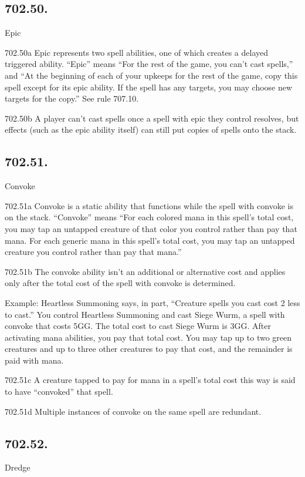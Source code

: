 \subsection*{702.50.}
Epic

702.50a Epic represents two spell abilities, one of which creates a delayed triggered ability. “Epic” means “For the rest of the game, you can’t cast spells,” and “At the beginning of each of your upkeeps for the rest of the game, copy this spell except for its epic ability. If the spell has any targets, you may choose new targets for the copy.” See rule 707.10.

702.50b A player can’t cast spells once a spell with epic they control resolves, but effects (such as the epic ability itself) can still put copies of spells onto the stack.

\subsection*{702.51.}
Convoke

702.51a Convoke is a static ability that functions while the spell with convoke is on the stack. “Convoke” means “For each colored mana in this spell’s total cost, you may tap an untapped creature of that color you control rather than pay that mana. For each generic mana in this spell’s total cost, you may tap an untapped creature you control rather than pay that mana.”

702.51b The convoke ability isn’t an additional or alternative cost and applies only after the total cost of the spell with convoke is determined.

Example: Heartless Summoning says, in part, “Creature spells you cast cost {2} less to cast.” You control Heartless Summoning and cast Siege Wurm, a spell with convoke that costs {5}{G}{G}. The total cost to cast Siege Wurm is {3}{G}{G}. After activating mana abilities, you pay that total cost. You may tap up to two green creatures and up to three other creatures to pay that cost, and the remainder is paid with mana.

702.51c A creature tapped to pay for mana in a spell’s total cost this way is said to have “convoked” that spell.

702.51d Multiple instances of convoke on the same spell are redundant.

\subsection*{702.52.}
Dredge

